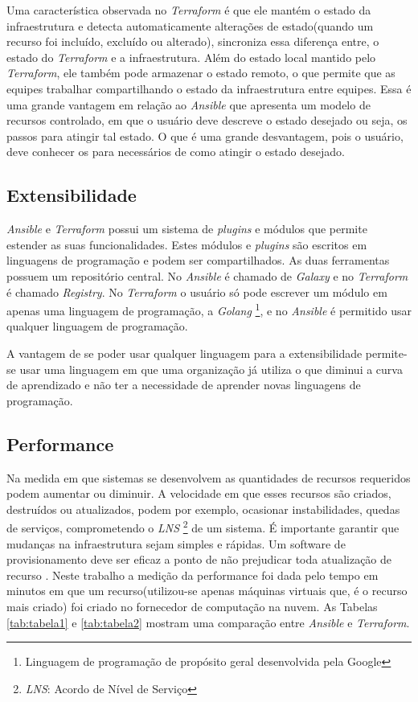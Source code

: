 Uma característica observada no \textit{Terraform} é que ele mantém o estado da infraestrutura e detecta automaticamente alterações de estado(quando um recurso foi incluído, excluído ou alterado), sincroniza essa diferença entre, o estado do \textit{Terraform} e a infraestrutura. Além do estado local mantido pelo \textit{Terraform}, ele também pode armazenar o estado remoto, o que permite que as equipes trabalhar compartilhando o estado da infraestrutura entre equipes. Essa é uma grande vantagem em relação ao \textit{Ansible} que apresenta um modelo de recursos controlado, em que o usuário deve descreve o estado desejado ou seja, os passos para atingir tal estado. O que é uma grande desvantagem, pois o usuário, deve conhecer os para necessários de como atingir o estado desejado. 


\subsection{Extensibilidade}

\textit{Ansible} e \textit{Terraform} possui um sistema de \textit{plugins} e módulos que permite estender as suas funcionalidades. Estes módulos e \textit{plugins} são escritos em linguagens de programação e podem ser compartilhados. As duas ferramentas possuem um repositório central. No \textit{Ansible} é chamado de \textit{Galaxy} e no \textit{Terraform} é chamado \textit{Registry}. No \textit{Terraform} o usuário só pode escrever um módulo em apenas uma linguagem de programação, a \textit{Golang}  \footnote{Linguagem de programação de propósito geral desenvolvida pela Google}, e no \textit{Ansible} é permitido usar qualquer linguagem de programação.  

A vantagem de se poder usar qualquer linguagem para a extensibilidade permite-se usar uma linguagem em que uma organização já utiliza o que diminui a curva de aprendizado e não ter a necessidade de aprender novas linguagens de programação.  

\subsection{Performance}
Na medida em que sistemas se desenvolvem as quantidades de recursos requeridos podem aumentar ou diminuir. A velocidade em que esses recursos são criados, destruídos ou atualizados, podem por exemplo, ocasionar instabilidades, quedas de serviços, comprometendo o \textit{LNS} \footnote{ \textit{LNS}: Acordo de Nível de Serviço} de um sistema. É importante garantir que mudanças na infraestrutura sejam simples e rápidas. Um software de provisionamento deve ser eficaz a ponto de não prejudicar toda atualização de recurso \cite{sre_google}. Neste trabalho a medição da performance foi dada pelo tempo em minutos em que um recurso(utilizou-se apenas máquinas virtuais que, é o recurso mais criado) foi criado no fornecedor de computação na nuvem. As Tabelas \ref{tab:tabela1} e \ref{tab:tabela2} mostram uma comparação entre \textit{Ansible} e \textit{Terraform}. 


